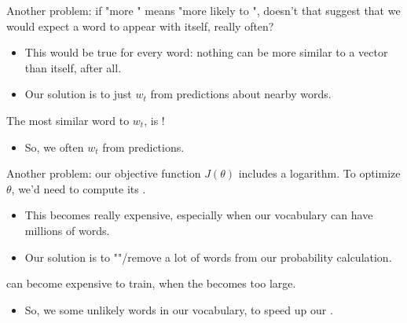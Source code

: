         Another problem: if "more " means "more likely to ", doesn't that suggest that we would expect a word to appear with itself, really often?

        \begin{itemize}
            \item This would be true for every word: nothing can be more similar to a vector than itself, after all.

            \item Our solution is to just  $w_t$ from predictions about nearby words.\\
        \end{itemize}

        \begin{concept}
            The most similar word to $w_t$, is !

            \begin{itemize}
                \item So, we often  $w_t$ from predictions.
            \end{itemize}
        \end{concept}


        Another problem: our objective function $J(\theta)$ includes a logarithm. To optimize $\theta$, we'd need to compute its .

        \begin{itemize}
            \item This becomes really expensive, especially when our vocabulary can have millions of words.

            \item Our solution is to ""/remove a lot of words from our probability calculation.
                \\
        \end{itemize}
            
        \begin{concept}
             can become expensive to train, when the  becomes too large.

            \begin{itemize}
                \item So, we  some unlikely words in our vocabulary, to speed up our .
            \end{itemize}
        \end{concept}


